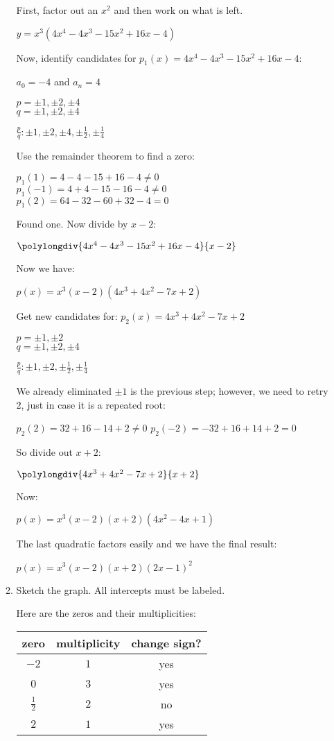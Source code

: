 \documentclass[letterpaper,12pt,fleqn]{article}
\begin{document}
\begin{enumerate}
\begin{enumerate}
    First, factor out an $x^2$ and then work on what is left.

    $y=x^3(4x^4-4x^3-15x^2+16x-4)$

    Now, identify candidates for $p_1(x)=4x^4-4x^3-15x^2+16x-4$:

    $a_0=-4$ and $a_n=4$

    $p=\pm1,\pm2,\pm4$ \\
    $q=\pm1,\pm2,\pm4$

    $\frac{p}{q}: \pm1,\pm2,\pm4,\pm\frac{1}{2},\pm\frac{1}{4}$

    Use the remainder theorem to find a zero:

    $p_1(1)=4-4-15+16-4\ne0$ \\
    $p_1(-1)=4+4-15-16-4\ne0$ \\
    $p_1(2)=64-32-60+32-4=0$

    Found one. Now divide by $x-2$:

    $\polylongdiv{4x^4-4x^3-15x^2+16x-4}{x-2}$

    Now we have:

    $p(x)=x^3(x-2)(4x^3+4x^2-7x+2)$

    Get new candidates for: $p_2(x)=4x^3+4x^2-7x+2$

    $p=\pm1,\pm2$ \\
    $q=\pm1,\pm2,\pm4$

    $\frac{p}{q}: \pm1,\pm2,\pm\frac{1}{2},\pm\frac{1}{4}$

    We already eliminated $\pm1$ is the previous step; however, we need to
    retry $2$, just in case it is a repeated root:

    $p_2(2)=32+16-14+2\ne0$
    $p_2(-2)=-32+16+14+2=0$

    So divide out $x+2$:

    $\polylongdiv{4x^3+4x^2-7x+2}{x+2}$

    Now:

    $p(x)=x^3(x-2)(x+2)(4x^2-4x+1)$

    The last quadratic factors easily and we have the final result:

    $p(x)=x^3(x-2)(x+2)(2x-1)^2$

  \item Sketch the graph. All intercepts must be labeled.

    Here are the zeros and their multiplicities:

    \begin{tabular}{ccc}
      zero & multiplicity & change sign? \\
      \hline
      $-2$ & $1$ & yes \\
      $0$ & $3$ & yes \\
      $\frac{1}{2}$ & $2$ & no \\
      $2$ & $1$ & yes
    \end{tabular}


\end{enumerate}
\end{enumerate}
\end{document}
